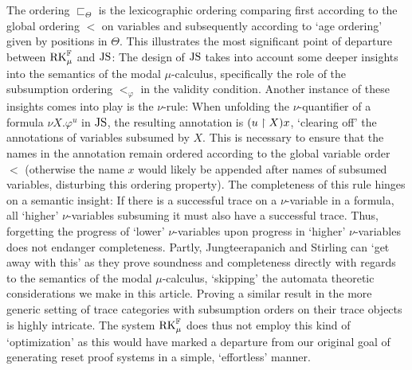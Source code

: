 The ordering $\sqsubset_\Theta$ is the lexicographic ordering comparing first
according to the global ordering $<$ on variables and subsequently according to
`age ordering' given by positions in $\Theta$. This illustrates the most
significant point of departure between $\mathrm{RK}_\mu^{\mathbb{F}}$ and $\mathrm{JS}$: The design of $\mathrm{JS}$
takes into account some deeper insights into the semantics of the
modal $\mu$-calculus, specifically the role of the subsumption ordering
$<_\varphi$ in the validity condition.
Another instance of these insights comes
into play is the $\nu$-rule: When unfolding the $\nu$-quantifier of a formula
$\nu X. \varphi^u$ in $\mathrm{JS}$, the resulting annotation is $(u \upharpoonright X)x$, `clearing
off' the annotations of variables subsumed by $X$. This is necessary to ensure
that the names in the annotation remain ordered according to the global variable
order $<$ (otherwise the name $x$ would likely be appended after names of
subsumed variables, disturbing this ordering property). The completeness of this
rule hinges on a semantic insight: If there is a successful trace on a
$\nu$-variable in a formula, all `higher' $\nu$-variables subsuming it must also
have a successful trace. Thus, forgetting the progress of `lower'
$\nu$-variables upon progress in `higher' $\nu$-variables does not endanger
completeness. Partly, Jungteerapanich and Stirling can `get away with this' as
they prove soundness and completeness directly with regards to the semantics of
the modal $\mu$-calculus, `skipping' the automata theoretic considerations we
make in this article. Proving a similar result in the more generic setting of
trace categories with subsumption orders on their trace objects is highly
intricate. The system $\mathrm{RK}_\mu^{\mathbb{F}}$ does thus not employ this kind of
`optimization' as this would have marked a departure from our original goal of
generating reset proof systems in a simple, `effortless' manner.

